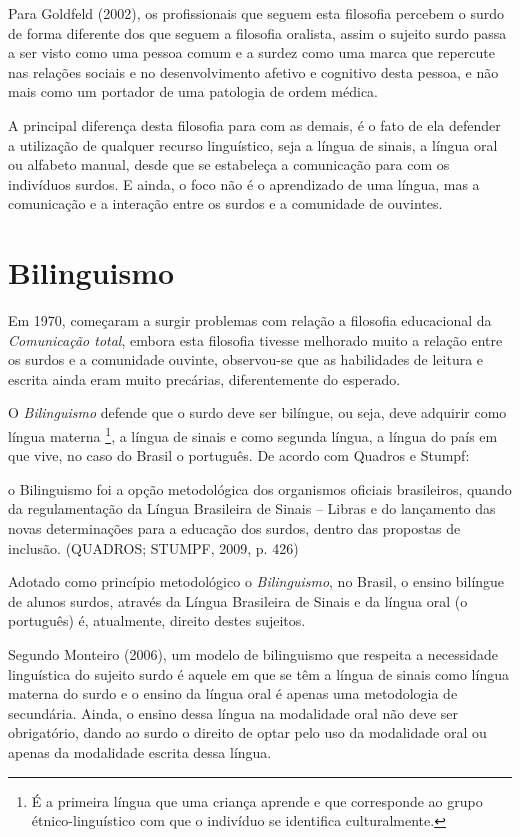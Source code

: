 \documentclass[brasil]{abnt}
\begin{document}
		 Para Goldfeld (2002), os profissionais que seguem esta filosofia percebem o surdo de forma diferente dos que seguem a filosofia oralista, assim o sujeito surdo passa a ser visto como uma pessoa comum 
		 e a surdez como uma marca que repercute nas relações sociais e no desenvolvimento afetivo e cognitivo desta pessoa, e não mais como um portador de uma patologia de ordem médica.
		
		 A principal diferença desta filosofia para com as demais, é o fato de ela defender a utilização de qualquer recurso linguístico, seja a língua de sinais, a língua oral ou alfabeto manual, desde que 
		 se estabeleça a comunicação para com os indivíduos surdos. E ainda, o foco não é o aprendizado de uma língua, mas a comunicação e a interação entre os surdos e a comunidade de ouvintes.
		 
		\section{Bilinguismo}
			Em 1970, começaram a surgir problemas com relação a filosofia educacional da \textit{Comunicação total}, embora esta filosofia tivesse melhorado muito a relação entre os surdos e a comunidade 
			ouvinte, observou-se que as habilidades de leitura e escrita ainda eram muito precárias, diferentemente do esperado. 
			
			O \textit{Bilinguismo} defende que o surdo deve ser bilíngue, ou seja, deve adquirir como língua materna \footnote{É a primeira língua que uma criança aprende e que corresponde ao grupo 
			étnico-linguístico com que o indivíduo se identifica culturalmente.}, a língua de sinais e como segunda língua, a língua do país em 
			que vive, no caso do Brasil o português. De acordo com Quadros e Stumpf:
			
				\begin{citacao}o Bilinguismo foi a opção metodológica dos organismos oficiais brasileiros, quando da regulamentação da Língua Brasileira de Sinais – Libras e do lançamento das novas 
								determinações para a educação dos surdos, dentro das propostas de inclusão. (QUADROS; STUMPF, 2009, p. 426)
				\end{citacao}
			
			Adotado como princípio metodológico o \textit{Bilinguismo}, no Brasil, o ensino bilíngue de alunos surdos, através da Língua Brasileira de Sinais e da língua oral (o português) é,  atualmente, direito destes sujeitos. 
			
			Segundo Monteiro (2006), um modelo de bilinguismo que respeita a necessidade linguística do sujeito surdo é aquele em que se têm a língua de sinais como língua materna do surdo e o ensino da língua 
			oral é apenas uma metodologia de secundária.  Ainda, o ensino dessa língua na modalidade oral não deve ser obrigatório, dando ao surdo o direito de optar pelo uso da modalidade oral ou apenas da modalidade escrita dessa língua.
						
\end{document}
